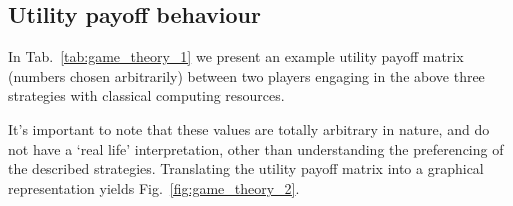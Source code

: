 \subsection{Utility payoff behaviour}

In Tab.~\ref{tab:game_theory_1} we present an example utility payoff matrix (numbers chosen arbitrarily) between two players engaging in the above three strategies with classical computing resources.

\begin{table}[!htbp]
\captionspacetab \caption{Example of a payoff matrix for two classical computing vendors. `\mbox{$\leftarrow/\rightarrow$}' indicates the \textsc{License} (from/to) strategy, `+' indicates the \textsc{Unify} strategy, and the off-diagonal combinations are the status quo \textsc{Isolation} strategy. $(X,Y)$ denotes the utility to players $X$ and $Y$ respectively. Note that there is some loss in net utility using \textsc{License}, owing to inefficiency through incurred transaction cost overheads.}\label{tab:game_theory_1}
\end{table}

It's important to note that these values are totally arbitrary in nature, and do not have a `real life' interpretation, other than understanding the preferencing of the described strategies. Translating the utility payoff matrix into a graphical representation yields Fig.~\ref{fig:game_theory_2}.

